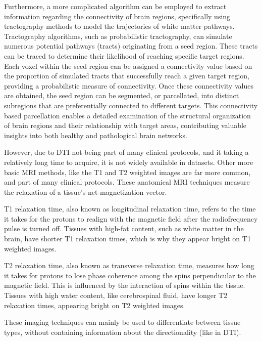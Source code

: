 Furthermore, a more complicated algorithm can be employed to extract information regarding the connectivity of brain regions, specifically using tractography methods to model the trajectories of white matter pathways. Tractography algorithms, such as probabilistic tractography, can simulate numerous potential pathways (tracts) originating from a seed region. These tracts can be traced to determine their likelihood of reaching specific target regions. Each voxel within the seed region can be assigned a connectivity value based on the proportion of simulated tracts that successfully reach a given target region, providing a probabilistic measure of connectivity. Once these connectivity values are obtained, the seed region can be segmented, or parcellated, into distinct subregions that are preferentially connected to different targets. This connectivity based parcellation enables a detailed examination of the structural organization of brain regions and their relationship with target areas, contributing valuable insights into both healthy and pathological brain networks. \cite{tract} \cite{tract2}\par
However, due to \ac{DTI} not being part of many clinical protocols, and it taking a relatively long time to acquire, it is not widely available in datasets. Other more basic \ac{MRI} methods, like the T1 and T2 weighted images are far more common, and part of many clinical protocols. These anatomical \ac{MRI} techniques measure the relaxation of a tissue's net magnetization vector. \cite{t1}\par
T1 relaxation time, also known as longitudinal relaxation time, refers to the time it takes for the protons to realign with the magnetic field after the radiofrequency pulse is turned off. Tissues with high-fat content, such as white matter in the brain, have shorter T1 relaxation times, which is why they appear bright on T1 weighted images. \cite{t1t2}\par
T2 relaxation time, also known as transverse relaxation time, measures how long it takes for protons to lose phase coherence among the spins perpendicular to the magnetic field. This is influenced by the interaction of spins within the tissue. Tissues with high water content, like cerebrospinal fluid, have longer T2 relaxation times, appearing bright on T2 weighted images. \cite{t1t2}\par
These imaging techniques can mainly be used to differentiate between tissue types, without containing information about the directionality (like in \ac{DTI}).

